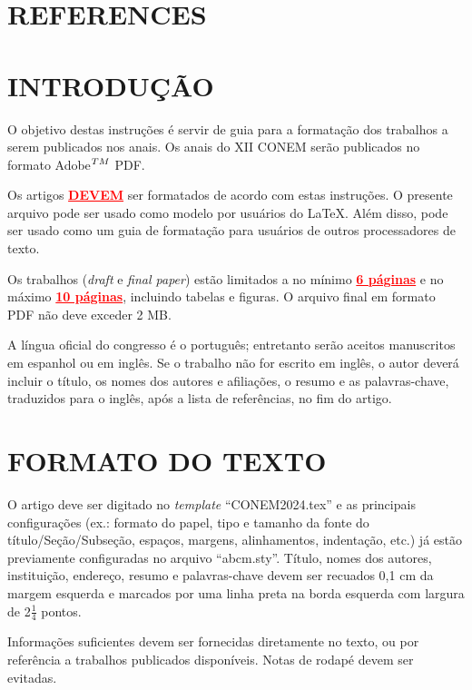 \documentclass[10pt,fleqn,a4paper,twoside]{article}
\begin{document}
    \section{REFERENCES}
    
    \section{INTRODUÇÃO}
        
        O objetivo destas instruções é servir de guia para a formatação dos trabalhos a serem publicados nos anais. Os anais do XII CONEM serão publicados no formato Adobe$^{\small{TM}}$ PDF.

        Os artigos \textcolor{red}{\underline{\textbf{DEVEM}}} ser formatados de acordo com estas instruções. O presente arquivo pode ser usado como modelo por usuários do \LaTeX. Além disso, pode ser usado como um guia de formatação para usuários de outros processadores de texto.

        Os trabalhos (\textit{draft} e \textit{final paper}) estão limitados a no mínimo \textcolor{red}{\underline{\textbf{6 páginas}}} e no máximo \textcolor{red}{\underline{\textbf{10 páginas}}}, incluindo tabelas e figuras. O arquivo final em formato PDF não deve exceder 2 MB.

        A língua oficial do congresso é o português; entretanto serão aceitos manuscritos em espanhol ou em inglês. Se o trabalho não for escrito em inglês, o autor deverá incluir o título, os nomes dos autores e afiliações, o resumo e as palavras-chave, traduzidos para o inglês, após a lista de referências, no fim do artigo.


    \section{FORMATO DO TEXTO}
        
        O artigo deve ser digitado no \textit{template} ``CONEM2024.tex'' e as principais configurações (ex.: formato do papel, tipo e tamanho da fonte do título/Seção/Subseção, espaços, margens, alinhamentos, indentação, etc.) já estão previamente configuradas no arquivo ``abcm.sty''. Título, nomes dos autores, instituição, endereço, resumo e palavras-chave devem ser recuados 0,1 cm da margem esquerda e marcados por uma linha preta na borda esquerda com largura de 2$\frac{1}{4}$ pontos.
        
        Informações suficientes devem ser fornecidas diretamente no texto, ou por referência a trabalhos publicados disponíveis. Notas de rodapé devem ser evitadas. 
        
\end{document}
